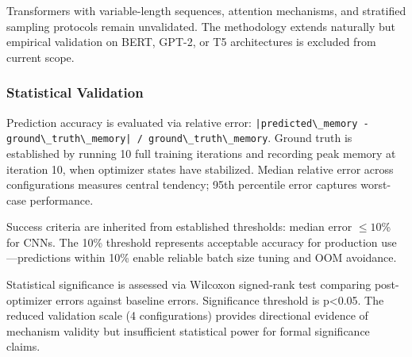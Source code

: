 Transformers with variable-length sequences, attention mechanisms, and stratified sampling protocols remain unvalidated. The methodology extends naturally but empirical validation on BERT, GPT-2, or T5 architectures is excluded from current scope.

\subsubsection{Statistical Validation}

Prediction accuracy is evaluated via relative error: \texttt{|predicted\textbackslash \_memory - ground\textbackslash \_truth\textbackslash \_memory| / ground\textbackslash \_truth\textbackslash \_memory}. Ground truth is established by running 10 full training iterations and recording peak memory at iteration 10, when optimizer states have stabilized. Median relative error across configurations measures central tendency; 95th percentile error captures worst-case performance.

Success criteria are inherited from established thresholds: median error $\leq 10$\% for CNNs. The 10\% threshold represents acceptable accuracy for production use---predictions within 10\% enable reliable batch size tuning and OOM avoidance.

Statistical significance is assessed via Wilcoxon signed-rank test comparing post-optimizer errors against baseline errors. Significance threshold is p<0.05. The reduced validation scale (4 configurations) provides directional evidence of mechanism validity but insufficient statistical power for formal significance claims.

